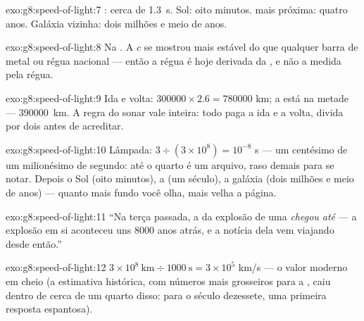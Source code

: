 \begin{solution}{exo:g8:speed-of-light:7}
: cerca de \qty{1.3}{s}. Sol: oito minutos.  mais próxima:
quatro anos. Galáxia vizinha: dois milhões e meio de anos.
\end{solution}

\begin{solution}{exo:g8:speed-of-light:8}
Na . A  $c$ se mostrou mais estável do que qualquer
barra de metal ou régua nacional --- então a régua é hoje derivada da
, e não a  medida pela régua.
\end{solution}

\begin{solution}{exo:g8:speed-of-light:9}
Ida e volta: $300000 \times 2.6 = 780000$ km; a  está na metade
--- \qty{390000}{km}. A regra do sonar vale inteira: todo  paga a
ida e a volta, divida por dois antes de acreditar.
\end{solution}

\begin{solution}{exo:g8:speed-of-light:10}
Lâmpada: $3 \div (3 \times 10^{8}) = 10^{-8}$ s --- um centésimo de
um milionésimo de segundo: até o quarto é um arquivo, raso demais
para se notar. Depois o Sol (oito minutos), a  (um século), a
galáxia (dois milhões e meio de anos) --- quanto mais fundo você
olha, mais velha a página.
\end{solution}

\begin{solution}{exo:g8:speed-of-light:11}
``Na terça passada, a  da explosão de uma  \emph{chegou até
} --- a explosão em si aconteceu uns $8000$ anos atrás, e a notícia
dela vem viajando desde então.''
\end{solution}

\begin{solution}{exo:g8:speed-of-light:12}
$3 \times 10^{8}\ \text{km} \div 1000\ \text{s} = 3 \times 10^{5}$
\unit{km/s} --- o valor moderno em cheio (a estimativa histórica, com
números mais grosseiros para a , caiu dentro de cerca de um
quarto disso: para o século dezessete, uma primeira resposta
espantosa).
\end{solution}

